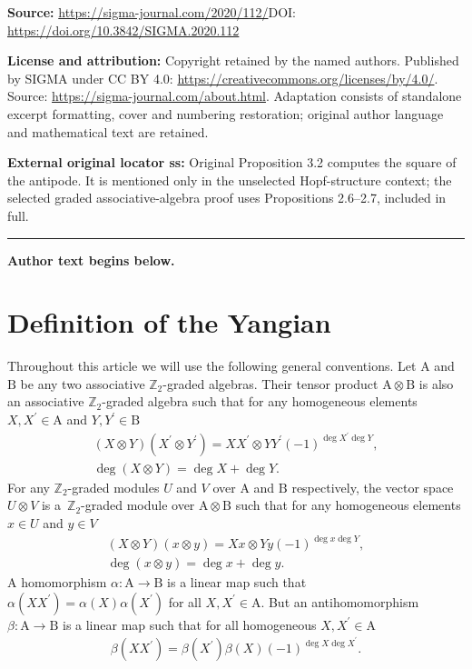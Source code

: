 \documentclass[11pt]{article}
\numberwithin{equation}{section}
\def\al{\alpha}
\def\be{\beta}
\def\ot{\otimes}
\def\ZZ{\mathbb{Z}}
\begin{document}
\noindent\textbf{Source:} \url{https://sigma-journal.com/2020/112/}\quad DOI: \url{https://doi.org/10.3842/SIGMA.2020.112}\par
\noindent\textbf{License and attribution:} Copyright retained by the named authors. Published by SIGMA under CC BY 4.0: \url{https://creativecommons.org/licenses/by/4.0/}. Source: \url{https://sigma-journal.com/about.html}. Adaptation consists of standalone excerpt formatting, cover and numbering restoration; original author language and mathematical text are retained.\par
\noindent\textbf{External original locator ss:} Original Proposition 3.2 computes the square of the antipode. It is mentioned only in the unselected Hopf-structure context; the selected graded associative-algebra proof uses Propositions 2.6–2.7, included in full.\par
\medskip\hrule\medskip\noindent\textbf{Author text begins below.}\par
\setcounter{section}{1}
\setcounter{subsection}{0}
\setcounter{subsubsection}{0}
\setcounter{Theorem}{0}
\setcounter{equation}{0}
\section{Definition of the Yangian}\label{sec:1}

Throughout this article we will use the following general conventions.
Let $\mathrm{A}$ and $\mathrm{B}$ be any two associative
$\ZZ_{2}$-graded algebras. Their tensor product
$\mathrm{A}\ot\mathrm{B}$ is also
an associative $\ZZ_2$-graded algebra such that for any homogeneous
elements
$X,X^\prime\in\mathrm{A}$ and $Y,Y^\prime\in\mathrm{B}$
\begin{gather}\label{conv1}
(X\ot Y) (X^\prime\ot Y^\prime)=X X^\prime\ot Y Y^\prime (-1)^{\deg X^\prime\deg Y},\\
\label{conv2}
\deg (X\ot Y)=\deg X+\deg Y .
\end{gather}
For any $\ZZ_2$-graded modules
$U$ and $V$ over $\mathrm{A}$ and $\mathrm{B}$ respectively,
the vector space $U\ot V$ is a~$\ZZ_2$-graded module over
$\mathrm{A}\ot\mathrm{B}$ such that for any homogeneous elements
$x\in U$ and $y\in V$
\begin{gather}\label{XY}
(X\ot Y) ( x\ot y ) =X x\ot Y y (-1)^{\deg x \deg Y},\\
\label{xy}
\deg ( x\ot y )=\deg x+\deg y .
\end{gather}
A homomorphism $\al\colon \mathrm{A}\to\mathrm{B}$ is a linear map
such that $\al (X X^\prime)=\al (X) \al (X^\prime)$ for all
$X,X^\prime\in\mathrm{A} $. But an antihomomorphism
$\be\colon \mathrm{A}\to\mathrm{B}$ is a linear map
such that for all homogeneous $X,X^\prime\in\mathrm{A}$
\begin{gather}\label{bb}
\be (X X^\prime )=\be (X^\prime) \be (X) (-1)^{\deg X\deg X^\prime}.
\end{gather}
\end{document}
